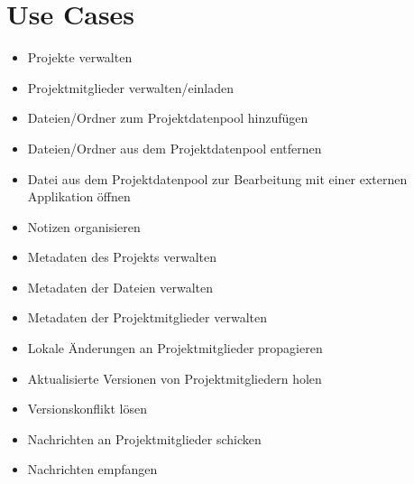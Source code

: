 
\section{Use Cases}


\begin{itemize}

\item Projekte verwalten
\item Projektmitglieder verwalten/einladen
\item Dateien/Ordner zum Projektdatenpool hinzufügen
\item Dateien/Ordner aus dem Projektdatenpool entfernen
\item Datei aus dem Projektdatenpool zur Bearbeitung mit einer externen Applikation öffnen
\item Notizen organisieren
\item Metadaten des Projekts verwalten
\item Metadaten der Dateien verwalten
\item Metadaten der Projektmitglieder verwalten
\item Lokale Änderungen an Projektmitglieder propagieren
\item Aktualisierte Versionen von Projektmitgliedern holen
\item Versionskonflikt lösen
\item Nachrichten an Projektmitglieder schicken
\item Nachrichten empfangen

\end{itemize}